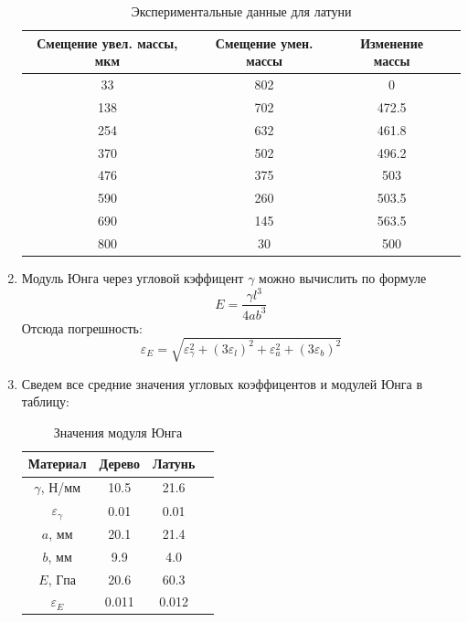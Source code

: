 \documentclass[12pt]{article}
\begin{document}
\begin{enumerate}
        \begin{table}[H]
            \centering
            \caption{Экспериментальные данные для латуни}
            \begin{tabular}{|c|c|c|c|}
                \hline
                Смещение увел. массы, мкм & Смещение умен. массы & Изменение массы \\ \hline
                33  & 802  & 0     \\ \hline
                138 & 702  & 472.5    \\ \hline
                254 & 632  & 461.8    \\ \hline
                370 & 502  & 496.2    \\ \hline
                476 & 375  & 503      \\ \hline
                590 & 260  & 503.5     \\ \hline
                690 & 145  & 563.5    \\ \hline
                800 & 30   & 500    \\ \hline
                \end{tabular}
            \end{table}

        \item Модуль Юнга через угловой кэффицент $\gamma$ можно
        вычислить по формуле
        \begin{equation}
            E = \frac{\gamma l^3}{4ab^3}
        \end{equation}
        Отсюда погрешность:
        \begin{equation*}
            \varepsilon_E = \sqrt{\varepsilon_{\gamma}^2 + (3\varepsilon_l)^2
            +\varepsilon_a^2 + (3\varepsilon_b)^2}
        \end{equation*}
        \item Сведем все средние значения угловых коэффицентов и модулей
        Юнга в таблицу:
        \begin{table}[H]
            \centering
            \caption{Значения модуля Юнга}
            \begin{tabular}{|c|c|c|c|}

            \hline
            Материал               & Дерево  & Латунь \\ \hline
            $\gamma$, Н/мм         & 10.5   & 21.6   \\ \hline
            $\varepsilon_{\gamma}$ & 0.01   & 0.01   \\ \hline
            $a$, мм                & 20.1  & 21.4  \\ \hline
            $b$, мм                & 9.9    & 4.0    \\ \hline
            $E$, Гпа               & 20.6     & 60.3     \\ \hline
            $\varepsilon_E$        & 0.011  & 0.012   \\ \hline
            \end{tabular}
        \end{table}

    \end{enumerate}
\end{document}
